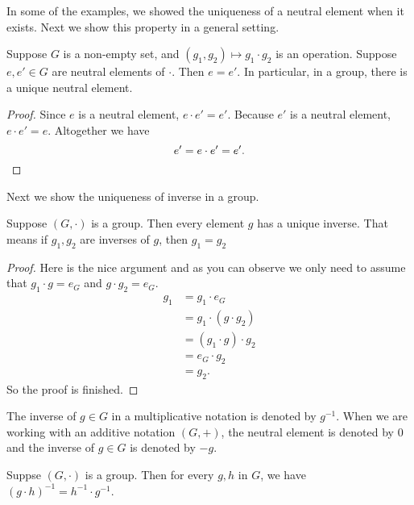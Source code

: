 In some of the examples, we showed the uniqueness
of a neutral element when it exists. Next we show
this property in a general setting.

\begin{lemma}
    Suppose $G$ is a non-empty set, and $(g_1,g_2)\mapsto g_1\cdot g_2$
    is an operation. Suppose $e,e'\in G$ are neutral
    elements of $\cdot$. Then $e=e'$. In particular,
    in a group, there is a unique neutral element.
\end{lemma}

\begin{proof}
    Since $e$ is a neutral element, $e\cdot e'=e'$.
    Because $e'$ is a neutral element, $e\cdot e'=e$.
    Altogether we have 
    \[e'=e\cdot e'=e'.\qedhere\]
\end{proof}

Next we show the uniqueness of inverse in a group.

\begin{lemma}
    Suppose $(G,\cdot)$ is a group. Then every element
    $g$ has a unique inverse. That means if $g_1,g_2$
    are inverses of $g$, then $g_1=g_2$
\end{lemma}

\begin{proof}
    Here is the nice argument and as you can observe we only
    need to assume that $g_1\cdot g=e_G$ and $g\cdot g_2=e_G$.
    \[\begin{split}
        g_1
        &=g_1\cdot e_G\\
        &=g_1\cdot (g\cdot g_2)\\
        &=(g_1\cdot g)\cdot g_2\\
        &=e_G\cdot g_2\\
        &=g_2.
    \end{split}\]
    So the proof is finished.
\end{proof}

The inverse of $g\in G$ in a multiplicative notation
is denoted by $g^{-1}$. When we are working with an additive
notation $(G,+)$, the neutral element is denoted by $0$
and the inverse of $g\in G$ is denoted by $-g$.

\begin{lemma}
    Suppse $(G,\cdot)$ is a group. Then for every $g,h$ in $G$,
    we have $(g\cdot h)^{-1}=h^{-1}\cdot g^{-1}$.
\end{lemma}

